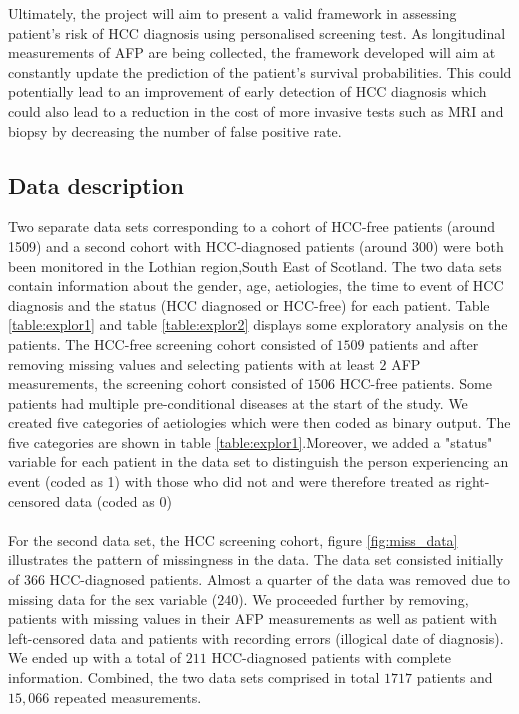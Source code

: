 \documentclass[11pt,twoside]{article}
\numberwithin{Theorem}{section}
\numberwithin{Definition}{section}
\numberwithin{Lemma}{section}
\numberwithin{Algorithm}{section}
\numberwithin{equation}{section}
\begin{document}
%
Ultimately, the project will aim to present a valid framework in assessing patient's risk of HCC diagnosis using personalised screening test. As longitudinal measurements of AFP are being collected, the framework developed will aim at constantly update the prediction of the patient's survival probabilities. This could potentially lead to an improvement of early detection of HCC diagnosis which could also lead to a reduction in the cost of more invasive tests such as MRI and biopsy by decreasing the number of false positive rate.
%
%
\subsection{Data description}
Two separate data sets corresponding to a cohort of HCC-free patients (around 1509) and a second cohort with HCC-diagnosed patients (around 300) were both been monitored in the Lothian region,South East of Scotland. The two data sets contain information about the gender, age, aetiologies, the time to event of HCC diagnosis and the status (HCC diagnosed or HCC-free) for each patient. Table \ref{table:explor1} and table \ref{table:explor2} displays some exploratory analysis on the patients. The HCC-free screening cohort consisted of $1509$ patients and after removing missing values and selecting patients with at least $2$ AFP measurements, the screening cohort consisted of $1506$ HCC-free patients. Some patients had multiple pre-conditional diseases at the start of the study. We created five categories of aetiologies which were then coded as binary output. The five categories are shown in table \ref{table:explor1}.Moreover, we added a "status" variable for each patient in the data set to distinguish the person experiencing an event (coded as 1) with those who did not and were therefore treated as right-censored data (coded as 0)\\ \\
For the second data set, the HCC screening cohort, figure \ref{fig:miss_data} illustrates the pattern of missingness in the data. The data set consisted initially of $366$ HCC-diagnosed patients. Almost a quarter of the data was removed due to missing data for the sex variable ($240$). We proceeded further by removing, patients with missing values in their AFP measurements as well as patient with left-censored data and patients with recording errors (illogical date of diagnosis). We ended up with a total of $211$ HCC-diagnosed patients with complete information.  Combined, the two data sets comprised in total $1717$ patients and $15,066$ repeated measurements.
\end{document}
